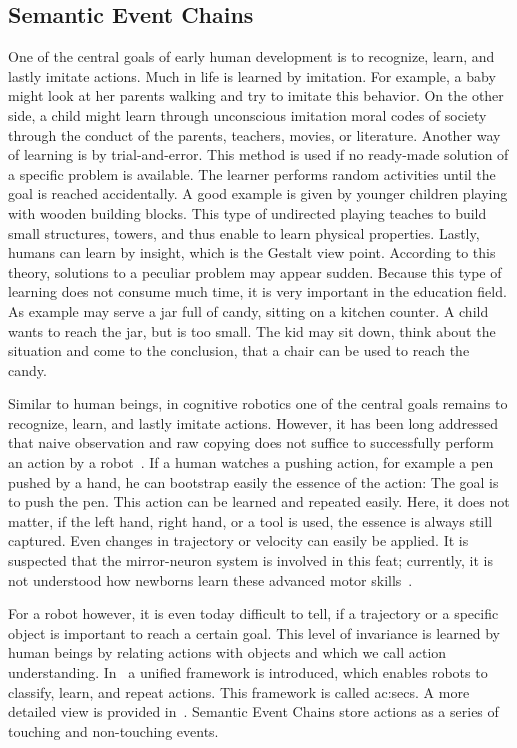 \subsection{Semantic Event Chains}
\label{ssec:action_methods_semanticeventchains}

One of the central goals of early human development is to recognize, learn, and lastly imitate actions.
Much in life is learned by imitation.
For example, a baby might look at her parents walking and try to imitate this behavior.
On the other side, a child might learn through unconscious imitation moral codes of society through the conduct of the parents, teachers, movies, or literature.
Another way of learning is by trial-and-error.
This method is used if no ready-made solution of a specific problem is available.
The learner performs random activities until the goal is reached accidentally.
A good example is given by younger children playing with wooden building blocks.
This type of undirected playing teaches to build small structures, \eg towers, and thus enable to learn physical properties.
Lastly, humans can learn by insight, which is the Gestalt view point.
According to this theory, solutions to a peculiar problem may appear sudden.
Because this type of learning does not consume much time, it is very important in the education field.
As example may serve a jar full of candy, sitting on a kitchen counter.
A child wants to reach the jar, but is too small.
The kid may sit down, think about the situation and come to the conclusion, that a chair can be used to reach the candy.

Similar to human beings, in cognitive robotics one of the central goals remains to recognize, learn, and lastly imitate actions.
However, it has been long addressed that naive observation and raw copying does not suffice to successfully perform an action by a robot~\cite{breazeal2002robots}.
If a human watches a pushing action, for example a pen pushed by a hand, he can bootstrap easily the essence of the action: The goal is to push the pen.
This action can be learned and repeated easily.
Here, it does not matter, if the left hand, right hand, or a tool is used, the essence is always still captured.
Even changes in trajectory or velocity can easily be applied.
It is suspected that the mirror-neuron system is involved in this feat; currently, it is not understood how newborns learn these advanced motor skills~\cite{rizzolatti2004mirror}.

For a robot however, it is even today difficult to tell, if a trajectory or a specific object is important to reach a certain goal.
This level of invariance is learned by human beings by relating actions with objects and which we call action understanding.
In~\cite{aksoy2011learning} a unified framework is introduced, which enables robots to classify, learn, and repeat actions.
This framework is called \glspl{ac:sec}.
A more detailed view is provided in~\cite{aksoy2012semantic}.
Semantic Event Chains store actions as a series of touching and non-touching events.

